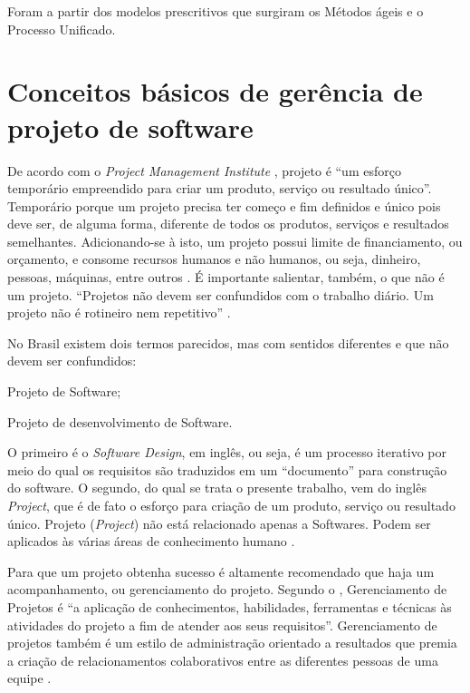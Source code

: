 \documentclass[
    12pt,               %
    openright,          %
    twoside,            %
    a4paper,            %
    chapter=TITLE,     %
    english,            %
    spanish,            %
    portuguese              %
    ]{abntex2}
\newcommand\dblquote[1]{\textquotedblleft #1\textquotedblright}
\begin{document}
Foram a partir dos modelos prescritivos que surgiram os Métodos ágeis e o Processo Unificado.

\section{Conceitos básicos de gerência de projeto de software}
De acordo com o \textit{Project Management Institute} \cite{pmi2013}, projeto é \dblquote{um esforço temporário empreendido para criar um produto, serviço ou resultado único}. Temporário porque um projeto precisa ter começo e fim definidos e único pois deve ser, de alguma forma, diferente de todos os produtos, serviços e resultados semelhantes. Adicionando-se à isto, um projeto possui limite de financiamento, ou orçamento, e consome recursos humanos e não humanos, ou seja, dinheiro, pessoas, máquinas, entre outros \cite[p.~2]{kerzner2011}. É importante salientar, também, o que não é um projeto. \dblquote{Projetos não devem ser confundidos com o trabalho diário. Um projeto não é rotineiro nem repetitivo} \cite[p.~6]{grayLarson2009}.

No Brasil existem dois termos parecidos, mas com sentidos diferentes e que não devem ser confundidos:

\begin{alineas}
	\item Projeto de Software;
	\item Projeto de desenvolvimento de Software.
\end{alineas}

O primeiro é o \textit{Software Design}, em inglês, ou seja, é um processo iterativo por meio do qual os requisitos são traduzidos em um \dblquote{documento} para construção do software. O segundo, do qual se trata o presente trabalho, vem do inglês \textit{Project}, que é de fato o esforço para criação de um produto, serviço ou resultado único. Projeto (\textit{Project}) não está relacionado apenas a Softwares. Podem ser aplicados às várias áreas de conhecimento humano \cite{pressman2006}.

Para que um projeto obtenha sucesso é altamente recomendado que haja um acompanhamento, ou gerenciamento do projeto. Segundo o , Gerenciamento de Projetos é \dblquote{a aplicação de conhecimentos, habilidades, ferramentas e técnicas às atividades do projeto a fim de atender aos seus requisitos}. Gerenciamento de projetos também é um estilo de administração orientado a resultados que premia a criação de relacionamentos colaborativos entre as diferentes pessoas de uma equipe \cite[p.~3]{grayLarson2009}.
\end{document}

